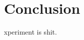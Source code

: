 %
%
\let\textcircled=\pgftextcircled
\chapter{Conclusion}
\label{chap:conclusion}

xperiment is shit.




